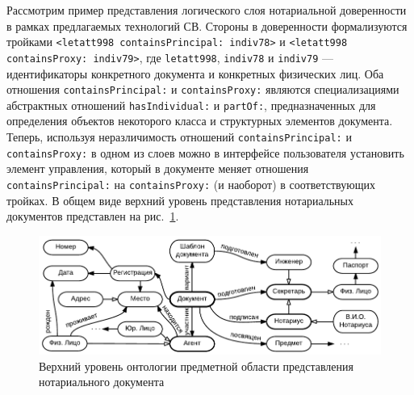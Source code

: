 \documentclass[utf8]{../IncArticle}
\newcommand{\e}[2][fcolor]{\textcolor{pcolor}{[}\textcolor{#1}{#2}\textcolor{pcolor}{]}}
\begin{document}

Рассмотрим пример представления логического слоя нотариальной доверенности
в рамках предлагаемых технологий СВ.  Стороны в доверенности
формализуются тройками \texttt{<letatt998 containsPrincipal: indiv78>}
и \texttt{<letatt998 containsProxy: indiv79>}, где \texttt{letatt998},
\texttt{indiv78} и \texttt{indiv79} --- идентификаторы конкретного
документа и конкретных физических лиц.  Оба отношения
\texttt{containsPrincipal:} и \texttt{containsProxy:} являются
специализациями абстрактных отношений \texttt{hasIndividual:} и
\texttt{partOf:}, предназначенных для определения объектов некоторого
класса и структурных элементов документа.  Теперь, используя
неразличимость отношений \texttt{containsPrincipal:} и
\texttt{containsProxy:} в одном из слоев можно в интерфейсе
пользователя установить элемент управления, который в документе меняет
отношения \texttt{containsPrincipal:} на \texttt{containsProxy:} (и
наоборот) в соответствующих тройках.  В общем виде верхний уровень представления
нотариальных документов представлен на рис.~\ref{notaryontology}.
\begin{figure}[!t]
\centering
\includegraphics[width=0.8\linewidth]{DocumentOntology-ru.pdf}
\caption{Верхний уровень онтологии предметной области представления
  нотариального документа}
\label{notaryontology}
\end{figure}
\end{document}
